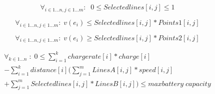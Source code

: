 \begin{equation}
\forall_{i\in1 \dots n, j \in 1 \dots m}: \; \;0\leq Selectedlines[i,j] \leq 1
\end{equation}

\begin{equation}
\forall_{i\in1 \dots n, j \in 1 \dots m}:\; v(e_i) \le Selectedlines[i,j] * Points1[i,j]
\end{equation}

\begin{equation}
\forall_{i\in1 \dots n, j \in 1 \dots m}:\; v(e_i) \ge Selectedlines[i,j] * Points2[i,j]
\end{equation}

\begin{equation}
\begin{split}
\forall_{k\in1 \dots n}\;:\;0 \le\sum_{i=1}^{k}chargerate[i]*charge[i]\\
-\sum_{i=1}^{k} distance[i](\sum_{j=1}^{m} LinesA[i,j]*speed[i,j]\\
+\sum_{j=1}^{m} Selectedlines[i,j]*LinesB[i,j]) \le maxbattery\;capacity
\end{split}
\end{equation}

